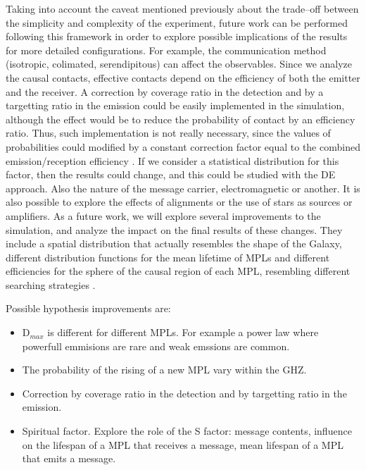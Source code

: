 \documentclass[crop]{CSLB}%
\begin{document}
Taking into account the caveat mentioned previously about the
trade--off between the simplicity and complexity of the experiment,
future work can be performed following this framework in order to
explore possible implications of the results for more detailed
configurations.
%
For example, the communication method (isotropic, colimated,
serendipitous) can affect the observables.
%
Since we analyze the causal contacts, effective contacts depend on the
efficiency of both the emitter and the receiver.
%
A correction by coverage ratio in the detection and by a targetting
ratio in the emission could be easily implemented in the simulation,
although the effect would be to reduce the probability of contact by
an efficiency ratio.
%
Thus, such implementation is not really necessary, since the values of
probabilities could modified by a constant correction factor equal to
the combined emission/reception efficiency
\citep{smith_broadcasting_2009, anchordoqui_upper_2019,
forgan_collimated_2014}.
%
If we consider a statistical distribution for this factor, then the
results could change, and this could be studied with the DE approach.
%
Also the nature of the message carrier, electromagnetic or another.
%
It is also possible to explore the effects of alignments or the use of
stars as sources or amplifiers.
%
%
As a future work, we will explore several improvements to the
simulation, and analyze the impact on the final results of these
changes.
%
They include a spatial distribution that actually resembles the shape
of the Galaxy, different distribution functions for the mean lifetime
of MPLs and different efficiencies for the sphere of the causal region
of each MPL, resembling different searching strategies
\citep{hippke_interstellar_2017}.


Possible hypothesis improvements are:

\begin{itemize}
   \item D$_{max}$ is different for different MPLs.  For example a power
      law where powerfull emmisions are rare and weak emssions are
      common.
   \item The probability of the rising of a new MPL vary within the GHZ.
   \item Correction by coverage ratio in the detection and by
      targetting ratio in the emission.
   \item Spiritual factor.  Explore the role of the S factor: message
      contents, influence on the lifespan of a MPL that receives a
      message, mean lifespan of a MPL that emits a message.
\end{itemize} 

 





\end{document}
